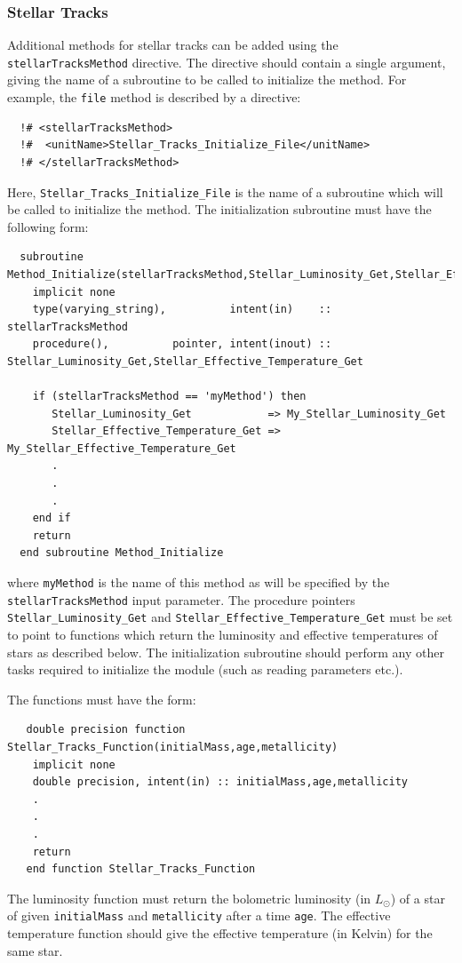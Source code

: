 \subsubsection{Stellar Tracks}

Additional methods for stellar tracks can be added using the {\tt stellarTracksMethod} directive. The directive should contain a single argument, giving the name of a subroutine to be called to initialize the method. For example, the {\tt file} method is described by a directive:
\begin{verbatim}
  !# <stellarTracksMethod>
  !#  <unitName>Stellar_Tracks_Initialize_File</unitName>
  !# </stellarTracksMethod>
\end{verbatim}
Here, {\tt Stellar\_Tracks\_Initialize\_File} is the name of a subroutine which will be called to initialize the method. The initialization subroutine must have the following form:
\begin{verbatim}
  subroutine Method_Initialize(stellarTracksMethod,Stellar_Luminosity_Get,Stellar_Effective_Temperature_Get)
    implicit none
    type(varying_string),          intent(in)    :: stellarTracksMethod
    procedure(),          pointer, intent(inout) :: Stellar_Luminosity_Get,Stellar_Effective_Temperature_Get
    
    if (stellarTracksMethod == 'myMethod') then
       Stellar_Luminosity_Get            => My_Stellar_Luminosity_Get
       Stellar_Effective_Temperature_Get => My_Stellar_Effective_Temperature_Get
       .
       .
       .
    end if
    return
  end subroutine Method_Initialize
\end{verbatim}
where {\tt myMethod} is the name of this method as will be specified by the {\tt stellarTracksMethod} input parameter. The procedure pointers {\tt Stellar\_Luminosity\_Get} and {\tt Stellar\_Effective\_Temperature\_Get} must be set to point to functions which return the luminosity and effective temperatures of stars as described below. The initialization subroutine should perform any other tasks required to initialize the module (such as reading parameters etc.).

The functions must have the form:
\begin{verbatim}
   double precision function Stellar_Tracks_Function(initialMass,age,metallicity)
    implicit none
    double precision, intent(in) :: initialMass,age,metallicity
    .
    .
    .
    return
   end function Stellar_Tracks_Function 
\end{verbatim}
The luminosity function must return the bolometric luminosity (in $L_\odot$) of a star of given {\tt initialMass} and {\tt metallicity} after a time {\tt age}. The effective temperature function should give the effective temperature (in Kelvin) for the same star.

